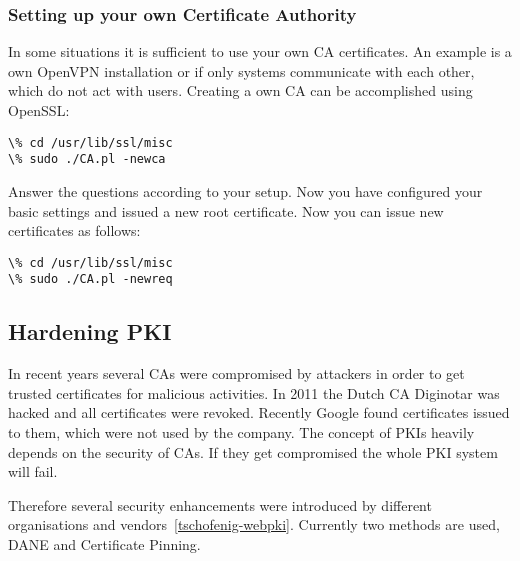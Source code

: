 \subsubsection{Setting up your own Certificate Authority}
\label{sec:setupownca}
In some situations it is sufficient to use your own CA certificates. An example is a own OpenVPN
installation or if only systems communicate with each other, which do not act with users. Creating
a own CA can be accomplished using OpenSSL:

\begin{lstlisting}
\% cd /usr/lib/ssl/misc
\% sudo ./CA.pl -newca
\end{lstlisting}

Answer the questions according to your setup. Now you have configured your basic settings and 
issued a new root certificate. Now you can issue new certificates as follows:

\begin{lstlisting}
\% cd /usr/lib/ssl/misc
\% sudo ./CA.pl -newreq
\end{lstlisting}

\subsection{Hardening PKI}
\label{sec:hardeningpki}
In recent years several CAs were compromised by attackers in order to get trusted 
certificates for malicious activities. In 2011 the Dutch CA Diginotar was hacked and
all certificates were revoked. Recently Google found certificates issued to them, which
were not used by the company. The concept of PKIs heavily depends on the security of CAs. 
If they get compromised the whole PKI system will fail.

Therefore several security enhancements were introduced by different organisations and
vendors~\ref{tschofenig-webpki}. Currently two methods are used, DANE and Certificate Pinning.






